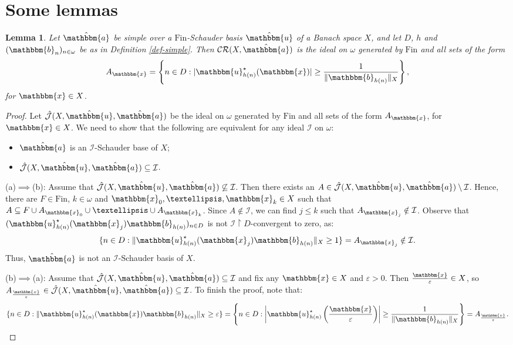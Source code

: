 \documentclass[10pt,a4paper]{amsart}
\newcommand{\I}{\mathcal{I}}
\newcommand{\J}{\mathcal{J}}
\newcommand{\Fin}{\mathrm{Fin}}
\newcommand{\CR}{\mathcal{CR}}
\newcommand{\w}{\mathbbm}
\newtheorem{lemma}[theorem]{Lemma}
\begin{document}
\section{Some lemmas}

\begin{lemma}
\label{general-lem1}
Let $\hat{\w{a}}$ be simple over a $\Fin$-Schauder basis $\hat{\w{u}}$ of a Banach space $X$, and let $D$, $h$ and $(\w{b}_n)_{n\in\omega}$ be as in Definition \ref{def-simple}. Then $\CR(X,\hat{\w{a}})$ is the ideal on $\omega$ generated by $\Fin$ and all sets of the form
    \[
    A_{\w{x}}=\left\{n\in D: |\w{u}^\star_{h(n)}(\w{x})|\geq\frac{1}{\|\w{b}_{h(n)}\|_X}\right\},
    \]
for $\w{x}\in X$.
\end{lemma}

\begin{proof}
Let $\hat{\J}(X,\hat{\w{u}},\hat{\w{a}})$ be the ideal on $\omega$ generated by $\Fin$ and all sets of the form $A_{\w{x}}$, for $\w{x}\in X$. We need to show that the following are equivalent for any ideal $\I$ on $\omega$:
\begin{itemize}
    \item[(a)] $\hat{\w{a}}$ is an $\I$-Schauder base of $X$;
    \item[(b)] $\hat{\J}(X,\hat{\w{u}},\hat{\w{a}})\subseteq\I$.
\end{itemize}

(a)$\implies$(b): Assume that $\hat{\J}(X,\hat{\w{u}},\hat{\w{a}})\not\subseteq\I$. Then there exists an $A\in\hat{\J}(X,\hat{\w{u}},\hat{\w{a}})\setminus\I$. Hence, there are $F\in\Fin$, $k\in\omega$ and $\w{x}_0,\ldots,\w{x}_k\in X$ such that $A\subseteq F\cup A_{\w{x}_0}\cup\ldots\cup A_{\w{x}_k}$. Since $A\notin\I$, we can find $j\leq k$ such that $A_{\w{x}_j}\notin\I$. Observe that $(\w{u}_{h(n)}^\star(\w{x}_j)\w{b}_{h(n)})_{n\in D}$ is not $\I\restriction D$-convergent to zero, as:
\[
\{n\in D: \|\w{u}_{h(n)}^\star(\w{x}_j)\w{b}_{h(n)}\|_X\geq 1\}=A_{\w{x}_j}\notin\I.
\]
Thus, $\hat{\w{a}}$ is not an $\I$-Schauder basis of $X$. 

(b)$\implies$(a): Assume that $\hat{\J}(X,\hat{\w{u}},\hat{\w{a}})\subseteq\I$ and fix any $\w{x}\in X$ and $\varepsilon>0$. Then $\frac{\w{x}}{\varepsilon}\in X$, so $A_{\frac{\w{x}}{\varepsilon}}\in\hat{\J}(X,\hat{\w{u}},\hat{\w{a}})\subseteq\I$. To finish the proof, note that:
\[
\{n\in D: \|\w{u}_{h(n)}^\star(\w{x})\w{b}_{h(n)}\|_X\geq \varepsilon\}=\left\{n\in D: \left|\w{u}_{h(n)}^\star\left(\frac{\w{x}}{\varepsilon}\right)\right|\geq \frac{1}{\|\w{b}_{h(n)}\|_X}\right\}=A_{\frac{\w{x}}{\varepsilon}}.
\]
\end{proof}
\end{document}
